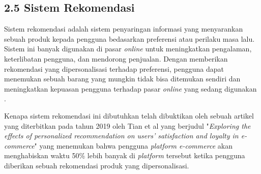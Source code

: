 \documentclass[a4paper]{article}
\begin{document}
\subsection*{2.5 Sistem Rekomendasi}

Sistem rekomendasi adalah sistem penyaringan informasi yang menyarankan sebuah produk kepada pengguna bedasarkan preferensi atau perilaku masa lalu. Sistem ini banyak digunakan di pasar \textit{online} untuk meningkatkan pengalaman, keterlibatan pengguna, dan mendorong penjualan. Dengan memberikan rekomendasi yang dipersonalisasi terhadap preferensi, pengguna dapat menemukan sebuah barang yang mungkin tidak bisa ditemukan sendiri dan meningkatkan kepuasan pengguna terhadap pasar \textit{online} yang sedang digunakan \autocite{adiwardana2019}.

Kenapa sistem rekomendasi ini dibutuhkan telah dibuktikan oleh sebuah artikel yang diterbitkan pada tahun 2019 oleh Tian et al yang berjudul "\textit{Exploring the effects of personalized recommendation on users' satisfaction and loyalty in e-commerce}" yang menemukan bahwa pengguna \textit{platform e-commerce}  akan menghabiskan waktu 50\% lebih banyak di \textit{platform} tersebut ketika pengguna diberikan sebuah rekomendasi produk yang dipersonalisasi.
\end{document}
